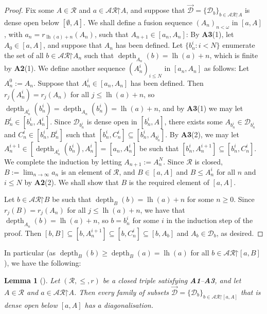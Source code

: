 \documentclass[11pt,reqno]{amsart}
\theoremstyle{plain}
\numberwithin{equation}{section}
\newtheorem{lemma}[theorem]{Lemma}
\theoremstyle{definition}
\newcommand{\func}{\operatorname}
\newcommand{\cal}{\mathcal}
\newcommand{\restrictedto}{\mathord{\upharpoonright}}
\newcommand{\lh}{\func{lh}}
\newcommand{\depth}{\func{depth}}
\newcommand{\D}{\cal{D}}
\begin{document}
\begin{proof}
    Fix some $A \in \cal{R}$ and $a \in \cal{AR}\restrictedto A$, and suppose that $\vec{\D} = \{\D_b\}_{b\in\cal{AR}\restrictedto A}$ is dense open below $[\emptyset,A]$. We shall define a fusion sequence $(A_n)_{n<\omega}$ in $[a,A]$, with $a_n = r_{\lh(a)+n}(A_n)$, such that $A_{n+1} \in [a_n,A_n]$: By \textbf{A3}(1), let $A_0 \in [a,A]$, and suppose that $A_n$ has been defined. Let $\{b_n^i : i < N\}$ enumerate the set of all $b \in \cal{AR}\restrictedto A_n$ such that $\depth_{A_n}(b) = \lh(a) + n$, which is finite by \textbf{A2}(1). We define another sequence $(A_n^i)_{i \leq N}$ in $[a_n,A_n]$ as follows: Let $A_n^0 := A_n$. Suppose that $A_n^i \in [a_n,A_n]$ has been defined. Then $r_j(A_n^i) = r_j(A_n)$ for all $j \leq \lh(a)+n$, so $\depth_{A_n^i}(b_n^i) = \depth_{A_n}(b_n^i) = \lh(a)+n$, and by \textbf{A3}(1) we may let $B_n^i \in [b_n^i,A_n^i]$. Since $\D_{b_n^i}$ is dense open in $[b_n^i,A]$, there exists some $A_{b_n^i} \in \D_{b_n^i}$ and $C_n^i \in [b_n^i,B_n^i]$ such that $[b_n^i,C_n^i] \subseteq [b_n^i,A_{b_n^i}]$. By \textbf{A3}(2), we may let $A_n^{i+1} \in [\depth_{A_n^i}(b_n^i),A_n^i] = [a_n,A_n^i]$ be such that $[b_n^i,A_n^{i+1}] \subseteq [b_n^i,C_n^i]$. We complete the induction by letting $A_{n+1} := A_n^N$. Since $\cal{R}$ is closed, $B := \lim_{n\to\infty} a_n$ is an element of $\cal{R}$, and $B \in [a,A]$ and $B \leq A_n^i$ for all $n$ and $i \leq N$ by \textbf{A2}(2). We shall show that $B$ is the required element of $[a,A]$.

    Let $b \in \cal{AR}\restrictedto B$ be such that $\depth_B(b) = \lh(a) + n$ for some $n \geq 0$. Since $r_j(B) = r_j(A_n)$ for all $j \leq \lh(a)+n$, we have that $\depth_{A_n}(b) = \lh(a)+n$, so $b = b_n^i$ for some $i$ in the induction step of the proof. Then $[b,B] \subseteq [b,A_n^{i+1}] \subseteq [b,C_n^i] \subseteq [b,A_b]$ and $A_b \in \D_b$, as desired.
\end{proof}

In particular (as $\depth_B(b) \geq \depth_B(a) = \lh(a)$ for all $b \in \cal{AR}\restrictedto[a,B]$), we have the following:

\begin{lemma}[{\cite[Lemma 3.16]{Y24}}]
\label{lem:R.is.semiselective}
    Let $(\cal{R},\leq,r)$ be a closed triple satisfying \textbf{A1}--\textbf{A3}, and let $A \in \cal{R}$ and $a \in \cal{AR}\restrictedto A$. Then every family of subsets $\vec{\D} = \{\D_b\}_{b \in \cal{AR}\restrictedto[a,A]}$ that is dense open below $[a,A]$ has a diagonalisation.
\end{lemma}
\end{document}
